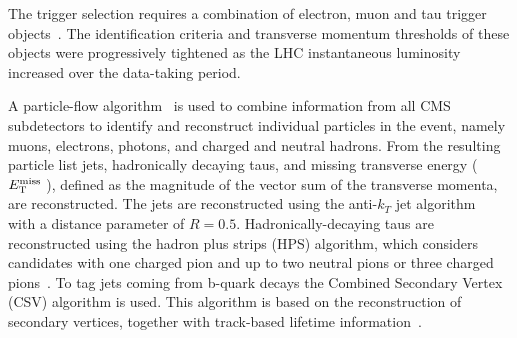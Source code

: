 The trigger selection requires a combination of electron, muon and tau trigger objects~\cite{CMS-PAS-EGM-10-004,CMS-PAS-MUO-10-002,CMS-EWK-TAU}. The identification criteria and transverse momentum thresholds of these objects were progressively tightened as the LHC instantaneous luminosity increased over the data-taking period.

A particle-flow algorithm~\cite{CMS-PAS-PFT-09-001,CMS-PAS-PFT-10-002,CMS-PAS-PFT-10-003} is used to combine information from all CMS subdetectors to identify and reconstruct individual particles in the event, namely muons, electrons, photons, and charged and neutral hadrons. From the resulting particle list jets, hadronically decaying taus, and missing transverse energy ($E_\mathrm{T}^{\mathrm{miss}}\;$), defined as the magnitude of the vector sum of the transverse momenta, are reconstructed. 
The jets are reconstructed using the anti-$k_T$ jet algorithm~\cite{Cacciari:fastjet1,Cacciari:fastjet2} with a distance parameter of $R=0.5$. Hadronically-decaying taus are reconstructed using the hadron plus strips (HPS) algorithm, which considers candidates with one charged pion and up to two neutral pions or three charged pions~\cite{CMS-PAS-TAU-11-001}. To tag jets coming from b-quark decays the Combined Secondary Vertex (CSV) algorithm is used. This algorithm is based on the reconstruction of secondary vertices, together with track-based lifetime information~\cite{BTV-11-004}. 

